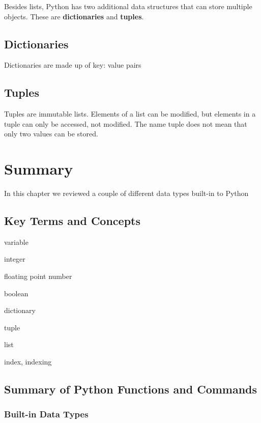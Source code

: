 \documentclass{book}
\begin{document}
    Besides lists, Python has two additional data structures that can store
multiple objects. These are \textbf{dictionaries} and \textbf{tuples}.

    \subsection{Dictionaries}\label{dictionaries}

    Dictionaries are made up of key: value pairs

    \subsection{Tuples}\label{tuples}

    Tuples are immutable lists. Elements of a list can be modified, but
elements in a tuple can only be accessed, not modified. The name tuple
does not mean that only two values can be stored.

    \section{Summary}\label{summary}

    In this chapter we reviewed a couple of different data types built-in to
Python

    \subsection{Key Terms and Concepts}\label{key-terms-and-concepts}

    variable

integer

floating point number

boolean

dictionary

tuple

list

index, indexing

    \subsection{Summary of Python Functions and
Commands}\label{summary-of-python-functions-and-commands}

    \subsubsection{Built-in Data Types}\label{built-in-data-types}
\end{document}
